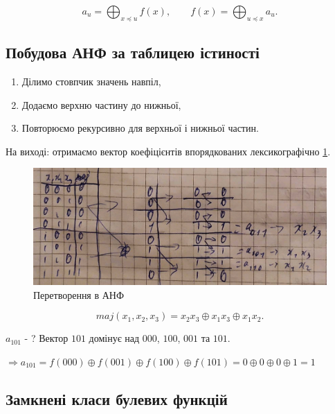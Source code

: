 \begin{theorem}
    \begin{equation}
        a_u = \bigoplus_{x \preceq u} f(x),
        \qquad f(x) = \bigoplus_{u \preceq x} a_u.
    \end{equation}
\end{theorem}

\subsection{Побудова АНФ за таблицею істиності}

\begin{enumerate}
    \item  Ділимо стовпчик значень навпіл,
    \item Додаємо верхню частину до нижньої,
    \item Повторюємо рекурсивно для верхньої і нижньої частин.
\end{enumerate}

На виході: отримаємо вектор коефіцієнтів впорядкованих лексикографічно \ref{fig:discrette_math:ANF-computation}.

\begin{figure}
    \centering
    \includegraphics[width=0.5\linewidth]{images/image.png}
    \caption{Перетворення в АНФ}
    \label{fig:discrette_math:ANF-computation}
\end{figure}

\begin{equation*}
    maj(x_1, x_2, x_3) =  x_2 x_3 \oplus x_1 x_3 \oplus x_1 x_2.
\end{equation*}

\begin{example}
    $a_{101}$ - ? Вектор $101$ домінує над $000$, $100$, $001$ та $101$.
\end{example}

$\Rightarrow a_{101} = f(000) \oplus f(001) \oplus f(100) \oplus f(101) = 0 \oplus 0 \oplus 0 \oplus 1 = 1$

\subsection{Замкнені класи булевих функцій}

